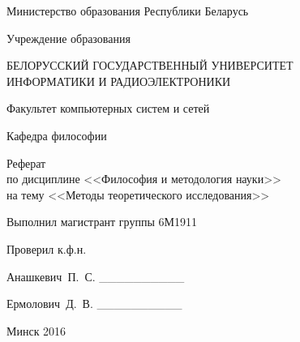 \begin{titlepage}
\thispagestyle{empty}
\setlength{\parindent}{0cm} %

{\centering{}
  Министерство образования Республики Беларусь

  \smallskip
  Учреждение образования

  БЕЛОРУССКИЙ ГОСУДАРСТВЕННЫЙ УНИВЕРСИТЕТ \\
  ИНФОРМАТИКИ И РАДИОЭЛЕКТРОНИКИ

  \smallskip
  Факультет компьютерных систем и сетей

  \smallskip
  Кафедра философии \par
}

\vspace{60mm}

{\centering{}
  Реферат \\
  по дисциплине <<Философия и методология науки>> \\
  на тему <<Методы теоретического исследования>>\par
}

\vspace{60mm}

\begin{minipage}{.55\linewidth}
  Выполнил магистрант группы 6М1911

  \smallskip
  Проверил к.ф.н.
\end{minipage}
\hfill
\begin{minipage}{.4\linewidth}
  \begin{flushright}
    Анашкевич~П.~С. \_\_\_\_\_\_\_\_\_\_

    \smallskip
    Ермолович~Д.~В. \_\_\_\_\_\_\_\_\_\_
  \end{flushright}
\end{minipage}

\vfill
{\centering{}
  Минск 2016\par
}

\setlength{\parindent}{1.25cm} %
\end{titlepage}
